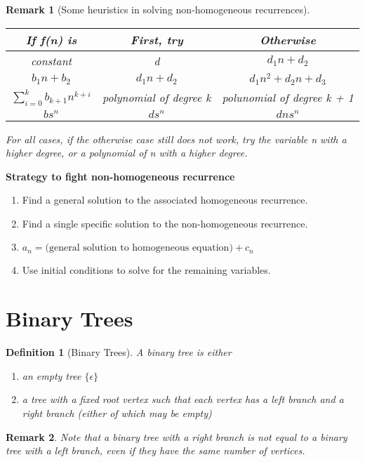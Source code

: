 \documentclass[11pt, oneside]{book}
\theoremstyle{break}
\newtheorem{defn}{Definition}[section]
\newtheorem*{remark}{Remark}
\begin{document}
\begin{remark}[Some heuristics in solving non-homogeneous recurrences]
\mbox{}\\[-2ex]
	\begin{tabular}{c | c | c}
		If f(n) is					& 	First, try						&	Otherwise \\
		\hline
		constant 					& 	d 								& $d_1n + d_2$ \\
		$b_1n + b_2$	&	$d_1n + d_2$	&	$d_1n^2 + d_2n + d_3$ \\
		$\sum_{i=0}^{k}b_{k+1}n^{k+i}$ &	polynomial of degree k 	& polunomial of degree k + 1 \\
		$bs^n$				&	$ds^n$						& $dns^n$ \\
	\end{tabular}

	For all cases, if the otherwise case still does not work, try the variable n with a higher degree, or a polynomial of n with a higher degree.
\end{remark}

\textbf{Strategy to fight non-homogeneous recurrence}

\begin{enumerate}
	\item Find a general solution to the associated homogeneous recurrence.
	\item Find a single specific solution to the non-homogeneous recurrence.
	\item $a_n = \bigg(\text{general solution to homogeneous equation}\bigg) + c_n$
	\item Use initial conditions to solve for the remaining variables.
\end{enumerate}


\section{Binary Trees}

\begin{defn}[Binary Trees]
	A binary tree is either
	\begin{enumerate}
		\item an empty tree $\{\epsilon\}$
		\item a tree with a fixed root vertex such that each vertex has a left branch and a right branch (either of which may be empty)
	\end{enumerate}
\end{defn}

\begin{remark}
	Note that a binary tree with a right branch is not equal to a binary tree with a left branch, even if they have the same number of vertices.
\end{remark}
\end{document}
